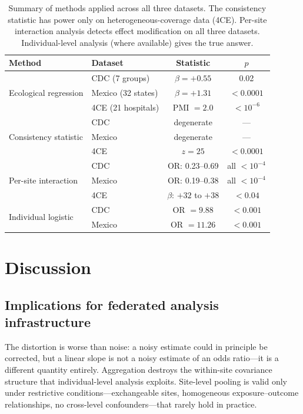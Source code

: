 \documentclass[11pt]{article}
\begin{document}
\begin{table}[t]
\centering
\caption{Summary of methods applied across all three datasets.  The
consistency statistic has power only on heterogeneous-coverage data (4CE).
Per-site interaction analysis detects effect modification on all three
datasets.  Individual-level analysis (where available) gives the true
answer.}
\label{tab:comparison}
\begin{tabular}{llcc}
\toprule
Method & Dataset & Statistic & $p$ \\
\midrule
\multirow{3}{*}{Ecological regression}
  & CDC (7 groups) & $\beta = +0.55$ & 0.02 \\
  & Mexico (32 states) & $\beta = +1.31$ & $< 0.0001$ \\
  & 4CE (21 hospitals) & PMI $= 2.0$ & $< 10^{-6}$ \\
\midrule
\multirow{3}{*}{Consistency statistic}
  & CDC & degenerate & --- \\
  & Mexico & degenerate & --- \\
  & 4CE & $z = 25$ & $< 0.0001$ \\
\midrule
\multirow{3}{*}{Per-site interaction}
  & CDC & OR: 0.23--0.69 & all $< 10^{-4}$ \\
  & Mexico & OR: 0.19--0.38 & all $< 10^{-4}$ \\
  & 4CE & $\beta$: $+32$ to $+38$ & $< 0.04$ \\
\midrule
\multirow{2}{*}{Individual logistic}
  & CDC & OR $= 9.88$ & $< 0.001$ \\
  & Mexico & OR $= 11.26$ & $< 0.001$ \\
\bottomrule
\end{tabular}
\end{table}


\section{Discussion}

\subsection{Implications for federated analysis infrastructure}

The distortion is worse than noise: a noisy estimate could in principle
be corrected, but a linear slope is not a noisy estimate of an odds
ratio---it is a different quantity entirely.  Aggregation destroys the
within-site covariance structure that individual-level analysis exploits.
Site-level pooling is valid only under restrictive conditions---exchangeable
sites, homogeneous exposure--outcome relationships, no cross-level
confounders---that rarely hold in practice.
\end{document}
